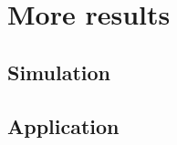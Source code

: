 \section{More results} %
\label{sec:more_results}


\subsection{Simulation} %
\label{sub:simulation}


\subsection{Application} %
\label{sub:application}




